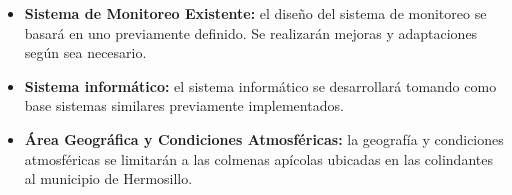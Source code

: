 

\begin{itemize}
    \item \textbf{Sistema de Monitoreo Existente:} el diseño del sistema de monitoreo se basará en uno previamente definido. Se realizarán mejoras y adaptaciones según sea necesario.
    \item \textbf{Sistema informático:} el sistema informático se desarrollará tomando como base sistemas similares previamente implementados.
    \item \textbf{Área Geográfica y Condiciones Atmosféricas:} la geografía y condiciones atmosféricas se limitarán a las colmenas apícolas ubicadas en las colindantes al municipio de Hermosillo.
\end{itemize}
